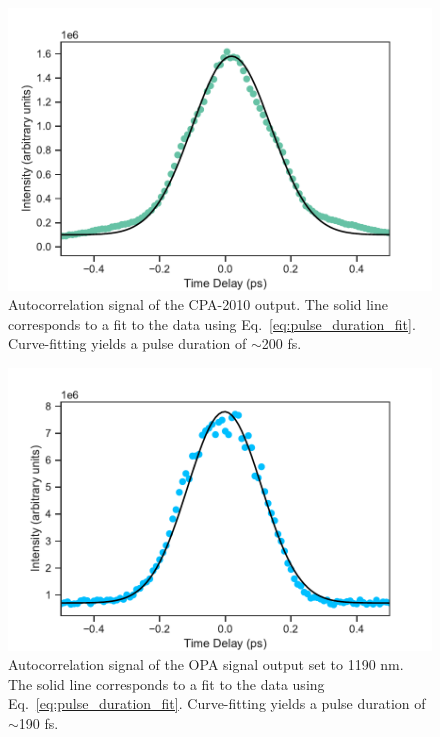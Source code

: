 
\begin{figure}[ht]
	\centering
	\includegraphics[scale=0.6]{images/chapter_methods/cpa_autocorr}
	\caption{Autocorrelation signal of the CPA-2010 output. The solid line corresponds to a fit to the data using Eq.\ \eqref{eq:pulse_duration_fit}. Curve-fitting yields a pulse duration of $\sim$200 fs.}
	\label{fig:cpa_autocorr}
\end{figure}

\begin{figure}[ht]
	\centering
	\includegraphics[scale=0.6]{images/chapter_methods/opa_pump_autocorr}
		\caption{Autocorrelation signal of the OPA signal output set to 1190 nm. The solid line corresponds to a fit to the data using Eq.\ \eqref{eq:pulse_duration_fit}. Curve-fitting yields a pulse duration of $\sim$190 fs.}
		\label{fig:opa_autocorr}
\end{figure}

